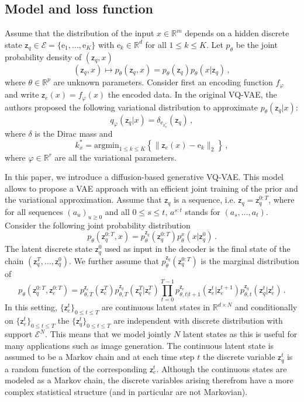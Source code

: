 \documentclass{article}
\theoremstyle{plain}
\theoremstyle{definition}
\theoremstyle{remark}
\newcommand{\rset}{\mathbb{R}}
\newcommand{\latentcont}{\mathsf{z}_e}
\newcommand{\latentdis}{\mathsf{z}_q}
\newcommand{\rme}{\mathrm{e}}
\newcommand{\embedspace}{\mathcal{E}}
\newcommand{\embed}{\rme}
\begin{document}
 \subsection{Model and loss function}
 Assume that the distribution of the input $x\in\rset^m$ depends on a hidden discrete state $\latentdis\in\embedspace = \{\embed_1,\ldots,\embed_K\}$ with $\embed_k\in\rset^d$ for all $1\leqslant k \leqslant K$. Let $p_\theta$ be the joint probability density of $(\latentdis,x)$
 $$
 (\latentdis,x)\mapsto p_\theta(\latentdis,x) =  p_\theta(\latentdis) p_\theta(x|\latentdis)\,,
 $$
 where $\theta\in\rset^p$ are unknown parameters.
Consider first an encoding function $f_\varphi$ and write $\latentcont(x)= f_\varphi(x)$ the encoded data. In the original VQ-VAE, the authors proposed the following variational distribution to approximate $p_\theta(\latentdis|x)$:
 $$
  q_\varphi(\latentdis|x) = \delta_{\embed_{k^*_x}}(\latentdis)\,,
  $$
  where $\delta$ is the Dirac mass and
 $$
  k^*_x = \mathrm{argmin}_{1\leqslant k \leqslant K}\left\{\|\latentcont(x)-\embed_k\|_2\right\}\,,
 $$
  where $\varphi\in\rset^r$ are all the variational parameters.


In this paper, we introduce a diffusion-based generative VQ-VAE. This model allows to propose a VAE approach with an efficient joint training of the prior and the variational approximation. 
Assume that $\latentdis$ is a sequence, i.e.  $\latentdis= \latentdis^{0:T}$, where for all sequences $(a_u)_{u\geqslant 0}$ and all $0\leqslant s\leqslant t$, $a^{s:t}$ stands for $(a_s,\ldots,a_t)$. Consider the following joint probability distribution 
$$
p_{\theta}(\latentdis^{0:T},x) = p^{\latentdis}_{\theta}(\latentdis^{0:T})p^x_{\theta}(x|\latentdis^{0})\,.
$$ 
The latent discrete state $\latentdis^0$ used as input in the decoder  is the final state of the chain $(\latentdis^T,\ldots,\latentdis^0)$. We further assume that $p_{\theta}^{\latentdis}(\latentdis^{0:T})$ is the marginal distribution of  
$$
p_{\theta}(\latentdis^{0:T},\latentcont^{0:T}) 
= p^{\latentcont}_{\theta,T}(\latentcont^T) p^{\latentdis}_{\theta,T}(\latentdis^T|\latentcont^T)\prod_{t=0}^{T-1}p^{\latentcont}_{\theta,t|t+1}(\latentcont^t|\latentcont^{t+1})p^{\latentdis}_{\theta,t}(\latentdis^t|\latentcont^t)\,.
$$
In this setting, $\{\latentcont^t\}_{0\leqslant t\leqslant T}$ are continuous latent states in $\mathbb{R}^{d\times N}$ and conditionally on $\{\latentcont^t\}_{0\leqslant t\leqslant T}$ the $\{\latentdis^t\}_{0\leqslant t\leqslant T}$ are independent with discrete distribution with support $\embedspace^N$. This means that we model jointly $N$  latent states as this is useful for many applications such as image generation. 
The continuous latent state is assumed to be a Markov chain and at each time step $t$ the discrete variable $\latentdis^t$ is a random function of the corresponding $\latentcont^t$.  Although the continuous states are modeled as a Markov chain, the discrete variables arising therefrom have a more complex statistical structure (and in particular are not Markovian).
\end{document}
